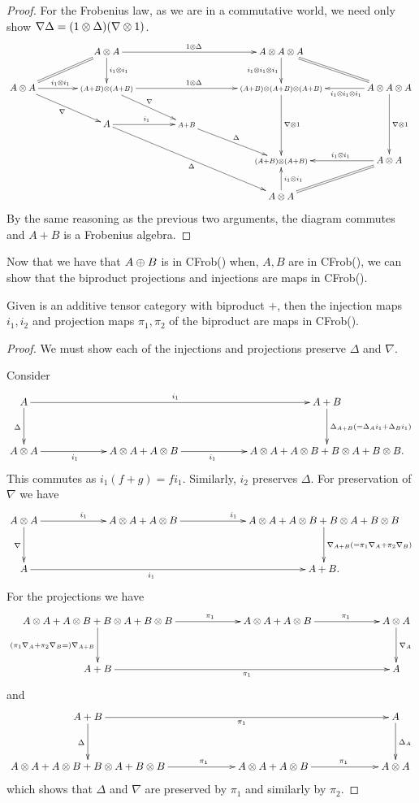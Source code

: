 \begin{proof}
  For the Frobenius law, as we are in a commutative world, we need only show
  $\nabla \Delta = (1\otimes\Delta)(\nabla\otimes1)$.
  \[
  \xymatrix@C+17pt{
      &A\*A \ar@{=}[ld] \ar[rr]^{1\*\Delta} \ar[d]^{i_1\*i_1} && A\*A\*A  \ar[d]_{i_1\*i_1\*i_1} \ar@{=}[dr] \\
      A\*A \ar[r]^(.45){i_1\*i_1}  \ar[dr]_{\nabla}
         &\scriptstyle{(A+B)\*(A+B)} \ar[rr]^{1\*\Delta} \ar[dr]^{\nabla}
         &&\scriptstyle{(A+B)\*(A+B)\*(A+B)}  \ar[dd]^{\nabla\*1} & A\*A\*A  \ar[l]^(.4){i_1\*i_1\*i_1}  \ar[dd]^{\nabla\*1}\\
     & A \ar[r]^{i_1} \ar[ddrr]_{\Delta} & \scriptstyle{A+B} \ar[dr]^{\Delta} \\
     & & & \scriptstyle{(A+B)\*(A+B)} & A\*A  \ar[l]_(.45){i_1\*i_1} \ar@{=}[dl]\\
     & & & A\*A \ar[u]_{i_1\*i_1}
    }
  \]
  By the same reasoning as the previous two arguments, the diagram commutes and $A+B$ is a Frobenius
  algebra.
\end{proof}

Now that we have that $A\oplus B$ is in CFrob(\X) when, $A,B$ are in CFrob(\X), we can show that the
biproduct projections and injections are maps in CFrob(\X).

\begin{lemma}\label{lem:biproduct-injections-and-projections-are-in-cfrob}
  Given \X is an additive tensor category with biproduct $+$, then the injection maps $i_1,i_2$ and
  projection maps $\pi_1,\pi_2$ of the biproduct are maps in CFrob(\X).
\end{lemma}
\begin{proof}
  We  must show each of the injections and projections preserve $\Delta$ and $\nabla$.

  Consider
  \[
     \xymatrix@C+40pt@R+10pt{
       A \ar[d]_{\Delta} \ar[rr]^{i_1} & &A+B \ar[d]^{\Delta_{A+B}(=\Delta_A i_1 + \Delta_B i_1)}\\
       A\*A \ar[r]_(.425){i_1} &A\*A+A\*B \ar[r]_(.375){i_1} & A\*A+A\*B+B\*A+B\*B.
     }
  \]
  This commutes as $i_1(f+g) = f i_1$. Similarly, $i_2$ preserves $\Delta$. For preservation of
  $\nabla$ we have
  \[
     \xymatrix@C+40pt@R+10pt{
       A\*A \ar[d]_{\nabla} \ar[r]^{i_1} &A\*A+A\*B\ar[r]^{i_1} &A\*A+A\*B+B\*A+B\*B
       \ar[d]^{\nabla_{A+B}(=\pi_1\nabla_A + \pi_2 \nabla_B)}\\
       A \ar[rr]_(.425){i_1} &  & A+B.
     }
  \]
  For the projections we have
  \[
    \xymatrix@C+40pt@R+10pt{
       {A\*A+A\*B+B\*A+B\*B}  \ar[d]_{(\pi_1\nabla_A + \pi_2\nabla_B=)\nabla_{A+B}} \ar[r]^(.625){\pi_1}
         &A\*A+A\*B \ar[r]^(.575){\pi_1} &A\*A\ar[d]^{\nabla_A}\\
       A+B \ar[rr]_{\pi_1}& & A
    }
  \]
  and
  \[
    \xymatrix@C+40pt@R+10pt{
       A+B \ar[rr]_{\pi_1}\ar[d]_{\Delta}& & A\ar[d]^{\Delta_A}\\
       {A\*A+A\*B+B\*A+B\*B}  \ar[r]^(.625){\pi_1}  &A\*A+A\*B \ar[r]^(.575){\pi_1} &A\*A
     }
  \]
  which shows that $\Delta$ and $\nabla$ are preserved by $\pi_1$ and similarly by $\pi_2$.

\end{proof}

